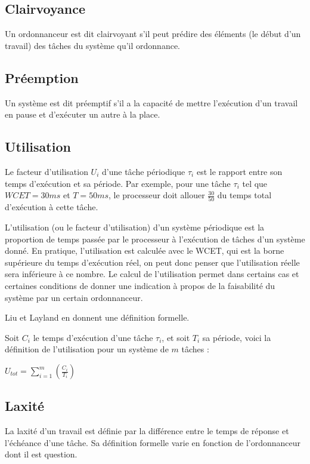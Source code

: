 \documentclass[11pt,a4paper,oneside]{report}
\begin{document}
	\subsection{Clairvoyance}
	Un ordonnanceur est dit \og clairvoyant\fg{}  s'il peut prédire des éléments (le début d'un travail) des tâches du système qu'il ordonnance.
	
	\subsection{Préemption} 
	Un système est dit préemptif s'il a la capacité 
	de mettre l'exécution d'un travail en pause et d'exécuter un autre à la place. 
	
	\subsection{Utilisation}
	Le facteur d'utilisation $U_i$ d'une tâche périodique $\tau_i$ est le rapport entre 
	son temps d'exécution et sa période. Par exemple, pour une tâche $\tau_i$ tel que 
	$WCET = 30 ms$ et $T = 50 ms$, le processeur doit allouer $\frac{30}{50}$ du temps 
	total d'exécution à cette tâche.\medskip
	
	L'utilisation (ou le facteur d'utilisation) d'un système périodique est la proportion de temps 
	passée par le processeur à l'exécution de tâches d'un système donné. En pratique, l'utilisation 
	est calculée avec le WCET, qui est la borne supérieure du temps d'exécution réel, on 
	peut donc penser que l'utilisation réelle sera inférieure à ce nombre.
	Le calcul de l'utilisation permet dans certains cas et certaines conditions de donner une indication 
	à propos de la faisabilité du système par un certain ordonnanceur. 
	\medskip
	
	Liu et Layland \cite{liu_scheduling_1973} en donnent une définition formelle.\medskip 
	
	Soit $C_i$ le temps d'exécution d'une tâche $\tau_i$, et soit $T_i$ sa période, voici la définition de 
	l'utilisation pour un système de $m$ tâches :\medskip
	\begin{center}
		$U_{tot} = \sum_{i = 1}^{m}(\frac{C_i}{T_i})$
	\end{center}
	
	\subsection{Laxité}
	\label{laxite}
	La laxité d'un travail est définie par la différence entre le temps de réponse et l'échéance 
	d'une tâche. Sa définition formelle varie en fonction de l'ordonnanceur dont il est question.
	
\end{document}

